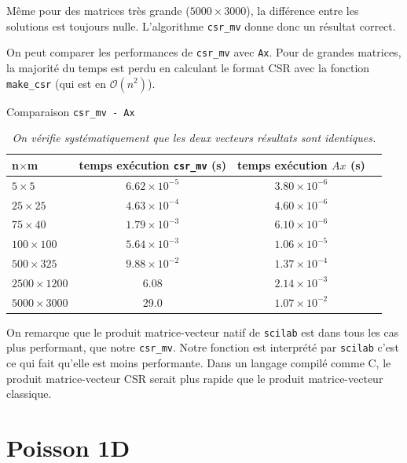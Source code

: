 \documentclass{article}
\begin{document}
Même pour des matrices très grande (\(5000\times3000\)), la différence entre les solutions est toujours nulle. L'algorithme \texttt{csr\_mv} donne donc un résultat correct.

On peut comparer les performances de \texttt{csr\_mv} avec \texttt{Ax}. Pour de grandes matrices, la majorité du temps est perdu en calculant le format CSR avec la fonction \texttt{make\_csr} (qui est en \(\mathcal{O}(n^2)\)). 

\begin{table}[H]
\caption{Comparaison \texttt{csr\_mv - Ax}}
\renewcommand*\arraystretch{1.3}
\begin{tabular}{|l|c|c|c|}
  \hline
  n\(\times\)m & temps exécution \texttt{csr\_mv} (s) & temps exécution \(Ax\) (s) \\
  \hline
	\(5 \times 5\)		&	\(6.62 \times 10^{-5}\)	&	\(3.80 \times 10^{-6}\)	\\
	\(25 \times 25\)	&	\(4.63 \times 10^{-4}\)	&	\(4.60 \times 10^{-6}\)	\\
	\(75 \times 40\)	&	\(1.79 \times 10^{-3}\)	&	\(6.10 \times 10^{-6}\)	\\
	\(100 \times 100\)	&	\(5.64 \times 10^{-3}\)	&	\(1.06 \times 10^{-5}\)	\\
	\(500 \times 325\)	&	\(9.88 \times 10^{-2}\)	&	\(1.37 \times 10^{-4}\)	\\
	\(2500 \times 1200\)&	6.08					&	\(2.14 \times 10^{-3}\)	\\
	\(5000 \times 3000\)&	29.0					&	\(1.07 \times 10^{-2}\)	\\
  \hline
\end{tabular}
\caption*{\textit{On vérifie systématiquement que les deux vecteurs résultats sont identiques.}}
\end{table}



On remarque que le produit matrice-vecteur natif de \texttt{scilab} est dans tous les cas plus performant, que notre \texttt{csr\_mv}. Notre fonction est interprété par \texttt{scilab} c'est ce qui fait qu'elle est moins performante. Dans un langage compilé comme C, le produit matrice-vecteur CSR serait plus rapide que le produit matrice-vecteur classique.

\section{Poisson 1D}
\end{document}
